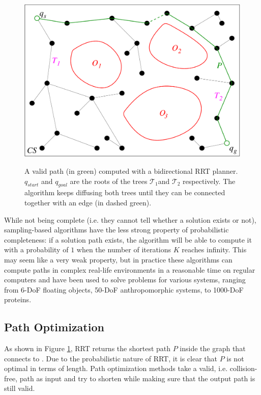 \begin{figure}
  \centering
      {\includegraphics[width = 0.8\linewidth]
        {src/chap1-path-optimization/rrt.pdf}}
      \caption{A valid path (in green) computed with a bidirectional
        RRT planner. $q_{start}$ and $q_{goal}$ are the roots of the
        trees $\mathcal{T}_{1}$and $\mathcal{T}_{2}$ respectively. The
        algorithm keeps diffusing both trees until they can be
        connected together with an edge (in dashed green).}
      \label{fig:chap1-rrt}
\end{figure}

While not being complete (i.e. they cannot tell whether a solution
exists or not), sampling-based algorithms have the less strong
property of probabilistic completeness: if a solution path exists, the
algorithm will be able to compute it with a probability of $1$ when
the number of iterations $K$ reaches infinity. This may seem like a
very weak property, but in practice these algorithms can compute paths
in complex real-life environments in a reasonable time on regular
computers and have been used to solve problems for various systems,
ranging from 6-DoF floating objects, 50-DoF anthropomorphic systems,
to 1000-DoF proteins.

\subsection{Path Optimization}
\label{subsec:chap1-path-optimization}

As shown in Figure \ref{fig:chap1-rrt}, RRT returns the shortest path
$P$ inside the graph that connects  to . Due to
the probabilistic nature of RRT, it is clear that $P$ is not optimal
in terms of length. Path optimization methods take a valid,
i.e. collision-free, path as input and try to shorten while making
sure that the output path is still valid.


